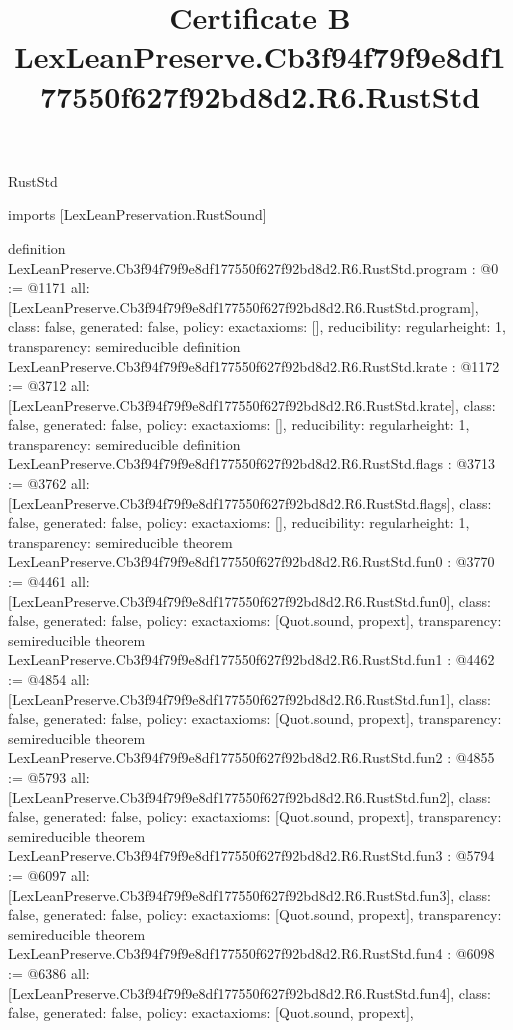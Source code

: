\begin{lexlean}{RustStd}
\title{Certificate B LexLeanPreserve.Cb3f94f79f9e8df177550f627f92bd8d2.R6.RustStd}
\begin{coremodule}
imports [LexLeanPreservation.RustSound]

definition LexLeanPreserve.Cb3f94f79f9e8df177550f627f92bd8d2.R6.RustStd.program : @0 := @1171 {
  all: [LexLeanPreserve.Cb3f94f79f9e8df177550f627f92bd8d2.R6.RustStd.program],
  class: false,
  generated: false,
  policy: exact{axioms: []},
  reducibility: regular{height: 1},
  transparency: semireducible
}
definition LexLeanPreserve.Cb3f94f79f9e8df177550f627f92bd8d2.R6.RustStd.krate : @1172 := @3712 {
  all: [LexLeanPreserve.Cb3f94f79f9e8df177550f627f92bd8d2.R6.RustStd.krate],
  class: false,
  generated: false,
  policy: exact{axioms: []},
  reducibility: regular{height: 1},
  transparency: semireducible
}
definition LexLeanPreserve.Cb3f94f79f9e8df177550f627f92bd8d2.R6.RustStd.flags : @3713 := @3762 {
  all: [LexLeanPreserve.Cb3f94f79f9e8df177550f627f92bd8d2.R6.RustStd.flags],
  class: false,
  generated: false,
  policy: exact{axioms: []},
  reducibility: regular{height: 1},
  transparency: semireducible
}
theorem LexLeanPreserve.Cb3f94f79f9e8df177550f627f92bd8d2.R6.RustStd.fun0 : @3770 := @4461 {
  all: [LexLeanPreserve.Cb3f94f79f9e8df177550f627f92bd8d2.R6.RustStd.fun0],
  class: false,
  generated: false,
  policy: exact{axioms: [Quot.sound, propext]},
  transparency: semireducible
}
theorem LexLeanPreserve.Cb3f94f79f9e8df177550f627f92bd8d2.R6.RustStd.fun1 : @4462 := @4854 {
  all: [LexLeanPreserve.Cb3f94f79f9e8df177550f627f92bd8d2.R6.RustStd.fun1],
  class: false,
  generated: false,
  policy: exact{axioms: [Quot.sound, propext]},
  transparency: semireducible
}
theorem LexLeanPreserve.Cb3f94f79f9e8df177550f627f92bd8d2.R6.RustStd.fun2 : @4855 := @5793 {
  all: [LexLeanPreserve.Cb3f94f79f9e8df177550f627f92bd8d2.R6.RustStd.fun2],
  class: false,
  generated: false,
  policy: exact{axioms: [Quot.sound, propext]},
  transparency: semireducible
}
theorem LexLeanPreserve.Cb3f94f79f9e8df177550f627f92bd8d2.R6.RustStd.fun3 : @5794 := @6097 {
  all: [LexLeanPreserve.Cb3f94f79f9e8df177550f627f92bd8d2.R6.RustStd.fun3],
  class: false,
  generated: false,
  policy: exact{axioms: [Quot.sound, propext]},
  transparency: semireducible
}
theorem LexLeanPreserve.Cb3f94f79f9e8df177550f627f92bd8d2.R6.RustStd.fun4 : @6098 := @6386 {
  all: [LexLeanPreserve.Cb3f94f79f9e8df177550f627f92bd8d2.R6.RustStd.fun4],
  class: false,
  generated: false,
  policy: exact{axioms: [Quot.sound, propext]},
}
\end{coremodule}
\end{lexlean}
